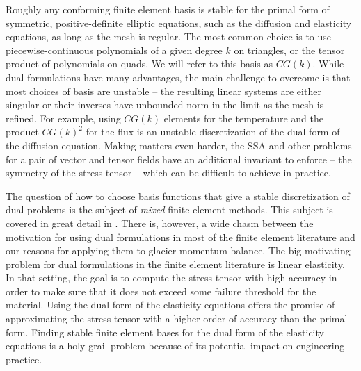 \documentclass{article}
\theoremstyle{definition}
\theoremstyle{plain}
\begin{document}
Roughly any conforming finite element basis is stable for the primal form of symmetric, positive-definite elliptic equations, such as the diffusion and elasticity equations, as long as the mesh is regular.
The most common choice is to use piecewise-continuous polynomials of a given degree $k$ on triangles, or the tensor product of polynomials on quads.
We will refer to this basis as $CG(k)$.
While dual formulations have many advantages, the main challenge to overcome is that most choices of basis are unstable -- the resulting linear systems are either singular or their inverses have unbounded norm in the limit as the mesh is refined.
For example, using $CG(k)$ elements for the temperature and the product $CG(k)^2$ for the flux is an unstable discretization of the dual form of the diffusion equation.
Making matters even harder, the SSA and other problems for a pair of vector and tensor fields have an additional invariant to enforce -- the symmetry of the stress tensor -- which can be difficult to achieve in practice.

The question of how to choose basis functions that give a stable discretization of dual problems is the subject of \emph{mixed} finite element methods.
This subject is covered in great detail in \citet{boffi2013mixed}.
There is, however, a wide chasm between the motivation for using dual formulations in most of the finite element literature and our reasons for applying them to glacier momentum balance.
The big motivating problem for dual formulations in the finite element literature is linear elasticity.
In that setting, the goal is to compute the stress tensor with high accuracy in order to make sure that it does not exceed some failure threshold for the material.
Using the dual form of the elasticity equations offers the promise of approximating the stress tensor with a higher order of accuracy than the primal form.
Finding stable finite element bases for the dual form of the elasticity equations is a holy grail problem because of its potential impact on engineering practice.
\end{document}

